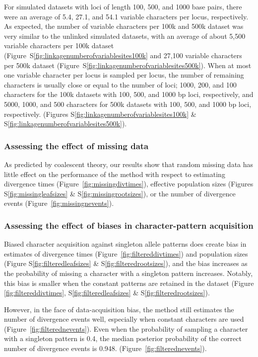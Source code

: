 For simulated datasets with loci of length 100, 500, and 1000 base pairs, there
were an average of 5.4, 27.1, and 54.1 variable characters per locus,
respectively.
As expected, the number of variable characters per 100k and 500k dataset
was very similar to the unlinked simulated datasets, with an average of
about
5,500 variable characters per 100k dataset
(Figure~S\ref{fig:linkagenumberofvariablesites100k}
and
27,100 variable characters per 500k dataset
(Figure~S\ref{fig:linkagenumberofvariablesites500k}).
When at most one variable character per locus is sampled per locus, the
number of remaining characters is usually close or equal to the
number of loci;
1000, 200, and 100 characters for the 100k datasets
with 100, 500, and 1000 bp loci, respectively, and
5000, 1000, and 500 characters for 500k datasets
with 100, 500, and 1000 bp loci, respectively.
(Figures
S\ref{fig:linkagenumberofvariablesites100k}
\&
S\ref{fig:linkagenumberofvariablesites500k}).


\subsubsection{Assessing the effect of missing data}

As predicted by coalescent theory, our results show that random missing data
has little effect on the performance of the method with respect to estimating
divergence times
(Figure~\ref{fig:missingdivtimes}),
effective population sizes
(Figures
S\ref{fig:missingleafsizes}
\&
S\ref{fig:missingrootsizes}), or the number of divergence events
(Figure~\ref{fig:missingnevents}).


\subsubsection{Assessing the effect of biases in character-pattern acquisition}

Biased character acquisition against singleton allele patterns does create
bias in estimates of divergence times
(Figure~\ref{fig:filtereddivtimes}) and
population sizes
(Figure
S\ref{fig:filteredleafsizes}
\&
S\ref{fig:filteredrootsizes}), and the bias increases as the probability of
missing a character with a singleton pattern increases.
Notably, this bias is smaller when the constant patterns are retained in
the dataset
(Figure
\ref{fig:filtereddivtimes},
S\ref{fig:filteredleafsizes}
\&
S\ref{fig:filteredrootsizes}).

However, in the face of data-acquisition bias, the method still estimates the
number of divergence events well, especially when constant characters are used
(Figure~\ref{fig:filterednevents}).
Even when the probability of sampling a character with a singleton pattern is
0.4, the median posterior probability of the correct number of divergence
events is 0.948.
(Figure~\ref{fig:filterednevents}).


